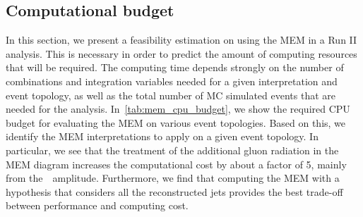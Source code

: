 \subsection{Computational budget}
\label{sec:mem_computational}
In this section, we present a feasibility estimation on using the MEM in a Run II analysis. This is necessary in order to predict the amount of computing resources that will be required. The computing time depends strongly on the number of combinations and integration variables needed for a given interpretation and event topology, as well as the total number of MC simulated events that are needed for the analysis. In~\cref{tab:mem_cpu_budget}, we show the required CPU budget for evaluating the MEM on various event topologies. Based on this, we identify the MEM interpretations to apply on a given event topology. In particular, we see that the treatment of the additional gluon radiation in the MEM diagram increases the computational cost by about a factor of 5, mainly from the~\ttbb~amplitude. Furthermore, we find that computing the MEM with a hypothesis that considers all the reconstructed jets provides the best trade-off between performance and computing cost.

